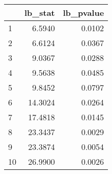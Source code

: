 \begin{tabular}{lrr}
\toprule
{} &  lb\_stat &  lb\_pvalue \\
\midrule
1  &   6.5940 &     0.0102 \\
2  &   6.6124 &     0.0367 \\
3  &   9.0367 &     0.0288 \\
4  &   9.5638 &     0.0485 \\
5  &   9.8452 &     0.0797 \\
6  &  14.3024 &     0.0264 \\
7  &  17.4818 &     0.0145 \\
8  &  23.3437 &     0.0029 \\
9  &  23.3874 &     0.0054 \\
10 &  26.9900 &     0.0026 \\
\bottomrule
\end{tabular}
